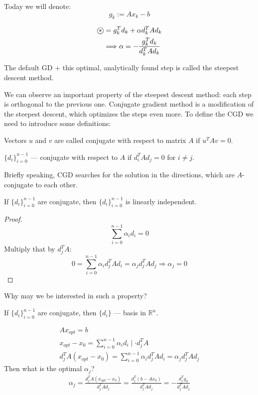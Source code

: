 Today we will denote: 
\[ 
    g_k := A x_k - b
\] 

\begin{align*}
    \oast &= g^T_k d_k + \alpha d_k^T A d_k  \\ 
    &\Longrightarrow \alpha = - \frac{g_k^T d_k}{d_k^T A d_k}
\end{align*}

The default GD + this optimal, analytically found step is called the steepest descent method.

We can observe an important property of the steepest descent method: each step is orthogonal to the previous one. Conjugate gradient method is a modification of the steepest descent, which optimizes the steps even more. To define the CGD we need to introduce some definitions: 

\begin{conj}
    Vectors $u$ and $v$ are called conjugate with respect to matrix $A$ if $u^T A v = 0$.
\end{conj}

\begin{conj}
    $\{d_i\}^{n-1}_{i=0}$ --- conjugate with respect  to $A$ if $d_i^T A d_j = 0$ for $i \neq j$.
\end{conj}

Briefly speaking, CGD searches for the solution in the directions, which are $A$-conjugate to each other.

\begin{theorem}
    If $\{d_i\}^{n-1}_{i=0}$ are conjugate, then $\{d_i\}^{n-1}_{i=0}$ is linearly independent.
\end{theorem}
\begin{proof}
    \[
        \sum^{n-1}_{i=0} \alpha_i d_i = 0 
    \]
    Multiply that by $d_j^T A$:
    \[
        0 = \sum^{n-1}_{i=0} \alpha_i d_j^T A d_i = \alpha_j d_j^T A d_j \Longrightarrow \alpha_j = 0
    \]
\end{proof}

Why may we be interested in such a property?

If $\{d_i\}^{n-1}_{i=0}$ are conjugate, then $\{d_i\}$ --- basis in $\mathbb{R}^n$.

\begin{gather*}
    A x_{opt} = b \\ 
    x_{opt} - x_0 = \sum^{n-1}_{i=0} \alpha_i d_i \mid \cdot d_j^T A \\
    d_j^T A (x_{opt} - x_0) = \sum^{n-1}_{i=0} \alpha_i d_j^T A d_i = \alpha_j d_j^T A d_j
\end{gather*}
Then what is the optimal $\alpha_j$?
\begin{gather*}
    \alpha_j = \frac{d_j^T A (x_{opt} - x_0)}{d_j^T A d_j} = \frac{d_j^T (b - A x_0)}{d_j^T A d_j} = - \frac{d_j^T g_0}{d_j^T A d_j}
\end{gather*}

